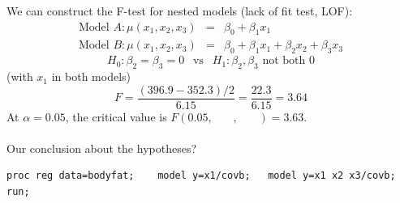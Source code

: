 We can construct the F-test for nested models (lack of fit test, LOF):
\begin{eqnarray*}
\mbox{Model } A: \mu(x_1,x_2,x_3) & = & \beta_0 + \beta_1 x_1 \\
\mbox{Model } B: \mu(x_1,x_2,x_3) & = & \beta_0 + \beta_1 x_1 + \beta_2 x_2 + \beta_3 x_3 
\end{eqnarray*} 
$$H_0: \beta_2=\beta_3=0 \ \ \mbox{  vs  } \ \ H_1: \beta_2, \beta_3 \mbox{ not both }0$$ 
(with $x_1$ in both models)
$$ F = \frac{(396.9-352.3)/2}{6.15} = \frac{22.3}{6.15}=3.64$$
At $\alpha=0.05$, the critical value is $F(0.05,~~~~~~~~ ,~~~~~~~~ ) = 3.63$.\\~\\
Our conclusion about the hypotheses?

\newpage

\begin{small}
\begin{verbatim}
proc reg data=bodyfat;    model y=x1/covb;   model y=x1 x2 x3/covb; run;
\end{verbatim}
\end{small}

